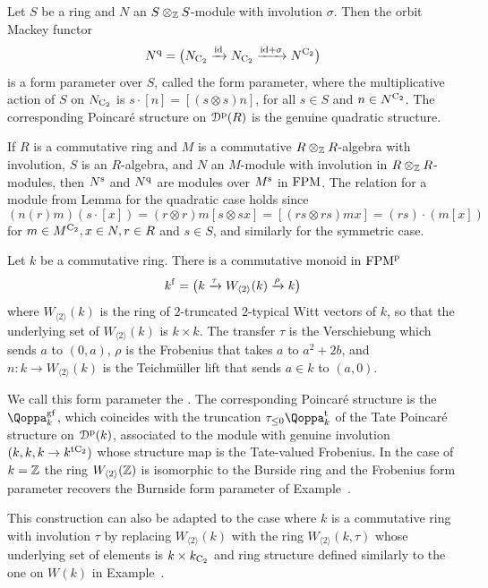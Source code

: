 \begin{example}
Let $S$ be a ring and $N$ an $S\otimes_{\mathbb{Z}} S$-module with involution $\sigma$. Then the orbit Mackey functor
\[
N^{\mathrm{q}}=\big(N_{\mathrm{C_2}}\xrightarrow{\mathrm{id}}N_{\mathrm{C_2}}\xrightarrow{\mathrm{id}+\sigma}N^{\mathrm{C_2}}\big)
\]
is a form parameter over $S$, called the  form parameter, where the multiplicative action of $S$ on $N_{\mathrm{C_2}}$ is $s\cdot [n]=[(s\otimes s) n]$, for all $s\in S$ and $n\in N^{\mathrm{C_2}}$. The corresponding Poincaré structure on ${\mathcal D}^{\mathrm{p}}(R)$ is the genuine quadratic structure.

If $R$ is a commutative ring and $M$ is a commutative $R\otimes_{\mathbb{Z}} R$-algebra with involution, $S$ is an $R$-algebra,  and $N$ an $M$-module with involution in $R\otimes_{\mathbb{Z}} R$-modules, then $N^{\mathrm{s}}$ and $N^{\mathrm{q}}$ are modules over $M^{\mathrm{s}}$ in $\mathrm {FPM}$. %
The relation for a module from Lemma  for the quadratic case holds since
\[
(n(r)m)(s\cdot [x])=
(r\otimes r)m[s\otimes s x]=[(rs\otimes rs) mx]=(rs)\cdot (m[x])
\]
for $m\in M^{\mathrm{C_2}}, x\in N, r\in R$ and $s\in S$, and similarly for the symmetric case.
\end{example}




\begin{example}%
\label{example:form_parameter_over_Tate_Poincare}%
Let $k$ be a commutative ring. There is a commutative monoid in $\mathrm {FPM}^{\mathrm p}$
\[
k^{\mathrm{f}}=\big(k\xrightarrow{\tau}W_{\langle 2\rangle}(k)\xrightarrow{\rho}k\big)
\]
where $W_{\langle 2\rangle}(k)$ is the ring of $2$-truncated $2$-typical Witt vectors of $k$, so that the underlying set of $W_{\langle 2\rangle}(k)$ is $k\times k$. The transfer $\tau$ is the Verschiebung which sends $a$ to $(0,a)$, $\rho$ is the Frobenius that takes $a$ to $a^2+2b$, and $n\colon k\to W_{\langle 2\rangle}(k)$ is the Teichmüller lift that sends $a\in k$ to $(a,0)$. 

We call this form parameter the . The corresponding Poincaré structure is the  $\QF^{\g\fr}_k$, which coincides with the truncation $\tau_{\leq 0}\QF^{\tate}_k$ of the Tate Poincaré structure 
on ${\mathcal D}^{\mathrm{p}}(k)$, associated to the module with genuine involution $(k,k,k\to k^{{\mathrm{t}\mathrm{C_2}}})$ whose structure map is the Tate-valued Frobenius. 
In the case of $k=\mathbb{Z}$ the ring $W_{\langle 2\rangle}(\mathbb{Z})$ is isomorphic to the Burside ring and the Frobenius form parameter recovers the Burnside form parameter of Example~.

This construction can also be adapted to the case where $k$ is a commutative ring with involution $\tau$ by replacing $W_{\langle 2\rangle}(k)$ with the ring $W_{\langle 2\rangle}(k,\tau)$ whose underlying set of elements is $k \times k_{\mathrm{C_2}}$ and ring structure defined similarly to the one on $W(k)$ in Example~.
\end{example}









